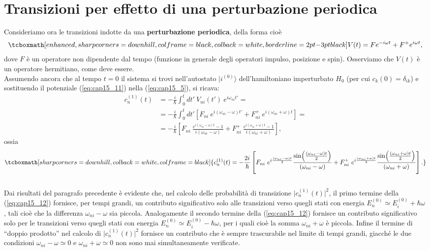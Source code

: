 \documentclass[a4paper,12pt,oneside]{book}
\begin{document}
\section{Transizioni per effetto di una perturbazione periodica}
Consideriamo ora le transizioni indotte da una \textbf{perturbazione periodica}, della forma cioè
	\begin{equation}
		\tcboxmath[enhanced, sharp corners=downhill, colframe=black, colback=white, borderline={2pt}{-3pt}{black}]{
			V(t) = Fe^{-i\omega t} + F^+ e ^{i\omega t},
			}
	\label{eq:cap15_11}
	\end{equation}
dove $F$ è un operatore non dipendente dal tempo (funzione in generale degli operatori impulso, posizione e spin). Osserviamo che $V(t)$ è un operatore hermitiano, come deve essere.	\\

Assumendo ancora che al tempo $t=0$ il sistema si trovi nell'autostato $\vert i ^{(0)}\rangle$ dell'hamiltoniano imperturbato $H_0$ (per cui $c_k (0) = \delta _{ik}$) e sostituendo il potenziale (\ref{eq:cap15_11}) nella (\ref{eq:cap15_5}), si ricava:
	\begin{align}
		c_n ^{(1)}(t) & =  -\frac{i}{\hbar}\int _0 ^t dt'\ V_{ni} (t') \ e^{i\omega _{ni}t'} = \nonumber \\
		&= -\frac{i}{\hbar}\int _0 ^t dt'\left[ F_{ni}\ e^{i(\omega _{ni}-\omega) t'} + F_{ni} ^+\ e ^{i(\omega _{ni} +\omega) t}\right] = \nonumber \\
		&= -\frac{i}{\hbar}\left[ F_{ni}\ \frac{e^{i(\omega _{ni}-\omega) t}-1}{i(\omega _{ni}-\omega)} + F_{ni} ^+\ \frac{e ^{i(\omega _{ni} +\omega) t}-1}{i(\omega _{ni}+\omega)}\right], 
	\end{align}
ossia
	\begin{equation}
		\tcboxmath[sharp corners=downhill, colback=white, colframe=black]{
			c_n ^{(1)}(t)= -\frac{2i}{\hbar}\left[ F_{ni}\ e^{i\frac{(\omega _{ni}-\omega) t}{2}}\frac{\sin(\frac{(\omega _{ni}-\omega) t}{2})}{(\omega _{ni}-\omega)}  + F_{ni} ^+\ e^{i\frac{(\omega _{ni}+\omega) t}{2}}\frac{\sin(\frac{(\omega _{ni}+\omega) t}{2})}{(\omega _{ni}+\omega)}\right].
			}
	\label{eq:cap15_12}
	\end{equation}\\
	
Dai risultati del paragrafo precedente è evidente che, nel calcolo delle probabilità di transizione $\vert c_n ^{(1)}(t)\vert ^2$, il primo termine della (\ref{eq:cap15_12}) fornisce, per tempi grandi, un contributo significativo solo alle transizioni verso quegli stati con energia $E_n ^{(0)} \simeq E_i ^{(0)}+ \hbar \omega $, tali cioè che la differenza  $\omega _{ni} - \omega$ sia piccola. Analogamente il secondo termine della (\ref{eq:cap15_12}) fornisce un contributo significativo solo per le transizioni verso quegli stati con energia  $E_n ^{(0)} \simeq E_i ^{(0)}- \hbar \omega $, per i quali cioè la somma $\omega _{ni} + \omega$ è piccola. Infine  il termine di ``doppio prodotto'' nel calcolo di  $\vert c_n ^{(1)}(t)\vert ^2$ fornisce un contributo che è sempre trascurabile nel limite di tempi grandi, giacché le due condizioni $\omega _{ni} - \omega\simeq 0$ e $\omega _{ni} + \omega\simeq 0$ non sono mai simultaneamente verificate.\\
\end{document}
